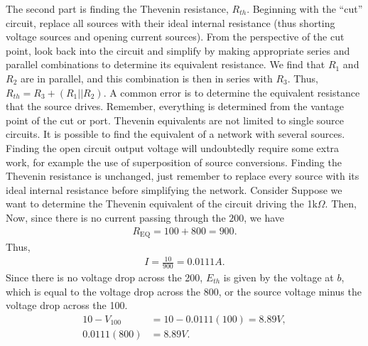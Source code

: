 \documentclass{report}
\begin{document}
\begin{itemize}
            \bigbreak \noindent 
            The second part is finding the Thevenin resistance, $R_{th}$. Beginning with the “cut” circuit, replace all sources with their ideal internal resistance (thus shorting voltage sources and opening current sources). From the perspective of the cut point, look back into the circuit and simplify by making appropriate series and parallel combinations to determine its equivalent resistance.
            \bigbreak \noindent 
            \bigbreak \noindent 
            We find that $R_1$ and $R_2$ are in parallel, and this combination is then in series with $R_3$. Thus, $R_{th} = R_3 + (R_1 || R_2)$. A common error is to determine the equivalent resistance that the source drives. Remember, everything is determined from the vantage point of the cut or port.
            \bigbreak \noindent 
            Thevenin equivalents are not limited to single source circuits. It is possible to find the equivalent of a network with several sources. Finding the open circuit output voltage will undoubtedly require some extra work, for example the use of superposition of source conversions. Finding the Thevenin resistance is unchanged, just remember to replace every source with its ideal internal resistance before simplifying the network.
            \bigbreak \noindent 
            Consider 
            \bigbreak \noindent 
            \bigbreak \noindent 
            Suppose we want to determine the Thevenin equivalent of the circuit driving the 1k$\Omega$. Then,
            \bigbreak \noindent 
            \bigbreak \noindent 
            Now, since there is no current passing through the $200$, we have
            \begin{align*}
                R_{\text{EQ}} = 100 + 800 = 900
            .\end{align*}
            Thus,
            \begin{align*}
                I = \frac{10}{900} = 0.0111A
            .\end{align*}
            Since there is no voltage drop across the 200, $E_{th}$ is given by the voltage at $b$, which is equal to the voltage drop across the 800, or the source voltage minus the voltage drop across the 100.
            \begin{align*}
                10 - V_{100} &= 10 - 0.0111(100) = 8.89V, \\
                0.0111(800) &= 8.89V
            .\end{align*}

\end{itemize}
\end{document}
